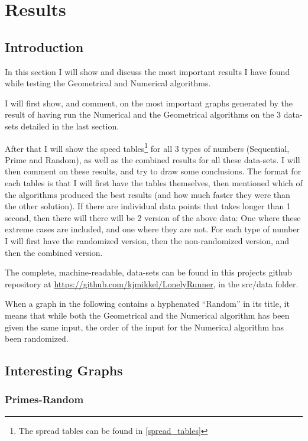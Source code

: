 \section{Results}
\label{results}
\subsection{Introduction}
In this section I will show and discuss the most important results I have found while testing the Geometrical and Numerical algorithms. 

I will first show, and comment, on the most important graphs generated by the result of having run the Numerical and the Geometrical algorithms on the 3 data-sets detailed in the last section.

After that I will show the speed tables\footnote{The spread tables can be found in \ref{spread_tables}} for all 3 types of numbers (Sequential, Prime and Random), as well as the combined results for all these data-sets. I will then comment on these results, and try to draw some conclusions. The format for each tables is that I will first have the tables themselves, then mentioned which of the algorithms produced the best results (and how much faster they were than the other solution). If there are individual data points that takes longer than 1 second, then there will there will be 2 version of the above data: One where these extreme cases are included, and one where they are not. For each type of number I will first have the randomized version, then the non-randomized version, and then the combined version.

The complete, machine-readable, data-sets can be found in this projects github repository at \underline{https://github.com/kjmikkel/LonelyRunner}, in the src/data folder.

When a graph in the following contains a hyphenated ``Random'' in its title, it means that while both the Geometrical and the Numerical algorithm has been given the same input, the order of the input for the Numerical algorithm has been randomized. 

\subsection{Interesting Graphs}



\subsubsection{Primes-Random}

